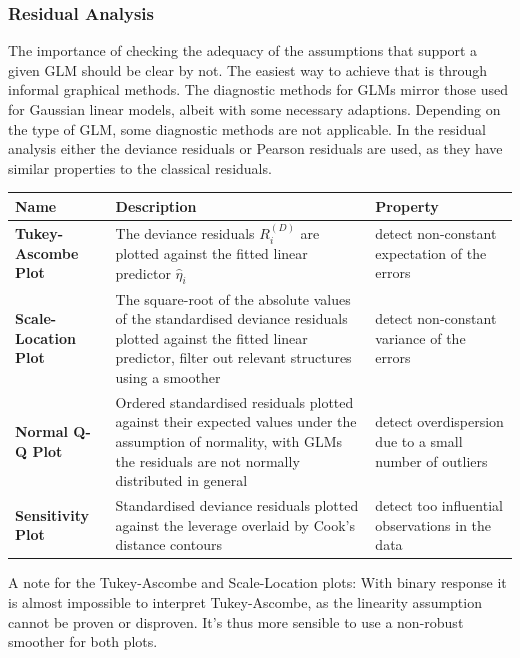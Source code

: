 \documentclass[11pt]{article}
\begin{document}
\subsubsection{Residual Analysis}
The importance of checking the adequacy of the assumptions that support a given GLM should be clear by not. The easiest way to achieve that is through informal graphical methods. The diagnostic methods for GLMs mirror those used for Gaussian linear models, albeit with some necessary adaptions. Depending on the type of GLM, some diagnostic methods are not applicable. In the residual analysis either the deviance residuals or Pearson residuals are used, as they have similar properties to the classical residuals.

\vspace{1em}
\noindent
\begin{minipage}{\textwidth}
	\renewcommand{\arraystretch}{1.5}
	\centering
	\begin{tabularx}{\textwidth}{l X X}
		\hline
		\textbf{Name} & \textbf{Description} & \textbf{Property}\\
		\hline
		\textbf{Tukey-Ascombe Plot} & The deviance residuals $R_i^{(D)}$ are plotted against the fitted linear predictor $\widehat{\eta}_i$ & detect non-constant expectation of the errors\\
		\textbf{Scale-Location Plot} & The square-root of the absolute values of the standardised deviance residuals plotted against the fitted linear predictor, filter out relevant structures using a smoother & detect non-constant variance of the errors\\
		\textbf{Normal Q-Q Plot} & Ordered standardised residuals plotted against their expected values under the assumption of normality, with GLMs the residuals are not normally distributed in general & detect overdispersion due to a small number of outliers\\
		\textbf{Sensitivity Plot} & Standardised deviance residuals plotted against the leverage overlaid by Cook's distance contours & detect too influential observations in the data\\
	\end{tabularx}
\end{minipage}

\noindent A note for the Tukey-Ascombe and Scale-Location plots: With binary response it is almost impossible to interpret Tukey-Ascombe, as the linearity assumption cannot be proven or disproven. It's thus more sensible to use a non-robust smoother for both plots.
\end{document}

